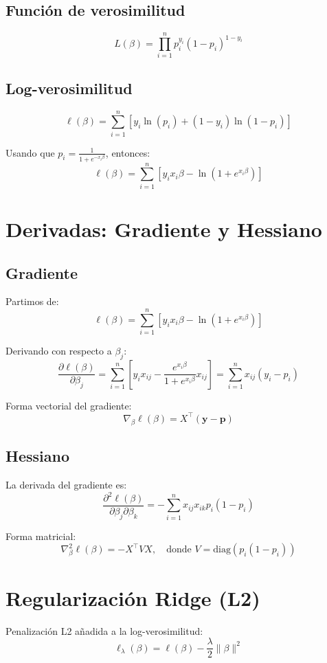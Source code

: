 \documentclass[12pt]{article}
\begin{document}
\subsection*{Función de verosimilitud}
\[
    L(\beta) = \prod_{i=1}^n p_i^{y_i} (1 - p_i)^{1 - y_i}
\]

\subsection*{Log-verosimilitud}
\[
    \ell(\beta) = \sum_{i=1}^n \left[ y_i \ln(p_i) + (1 - y_i) \ln(1 - p_i) \right]
\]

Usando que $p_i = \frac{1}{1 + e^{-x_i \beta}}$, entonces:
\[
    \ell(\beta) = \sum_{i=1}^n \left[ y_i x_i \beta - \ln(1 + e^{x_i \beta}) \right]
\]

\section*{Derivadas: Gradiente y Hessiano}

\subsection*{Gradiente}
Partimos de:
\[
    \ell(\beta) = \sum_{i=1}^n \left[ y_i x_i \beta - \ln(1 + e^{x_i \beta}) \right]
\]

Derivando con respecto a $\beta_j$:
\[
    \frac{\partial \ell(\beta)}{\partial \beta_j} = \sum_{i=1}^n \left[ y_i x_{ij} - \frac{e^{x_i \beta}}{1 + e^{x_i \beta}} x_{ij} \right] = \sum_{i=1}^n x_{ij}(y_i - p_i)
\]

Forma vectorial del gradiente:
\[
    \nabla_\beta \ell(\beta) = X^\top (\mathbf{y} - \mathbf{p})
\]

\subsection*{Hessiano}
La derivada del gradiente es:
\[
    \frac{\partial^2 \ell(\beta)}{\partial \beta_j \partial \beta_k} = - \sum_{i=1}^n x_{ij} x_{ik} p_i (1 - p_i)
\]

Forma matricial:
\[
    \nabla^2_\beta \ell(\beta) = - X^\top V X, \quad \text{donde } V = \text{diag}(p_i (1 - p_i))
\]

\section*{Regularización Ridge (L2)}

Penalización L2 añadida a la log-verosimilitud:
\[
    \ell_\lambda(\beta) = \ell(\beta) - \frac{\lambda}{2} \|\beta\|^2
\]
\end{document}
